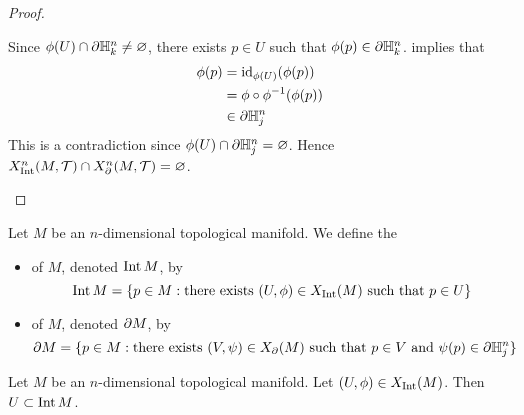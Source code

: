 \documentclass{book}
\begin{document}
\begin{proof}
\begin{enumerate}
			Since $\phi(U) \cap \partial \mathbb{H}^n_k \neq \varnothing$, there exists $p \in U$ such that $\phi(p) \in \partial \mathbb{H}^n_k$.  implies that 
			\begin{align*}
				\phi(p)
				& = \operatorname{id}_{\phi(U)}(\phi(p)) \\
				& = \phi \circ \phi^{-1}(\phi(p)) \\
				& \in \partial \mathbb{H}^n_j
			\end{align*}
			This is a contradiction since $\phi(U) \cap \partial \mathbb{H}^n_j = \varnothing$. Hence $X^n_{\operatorname{Int}}(M, \mathcal{T}) \cap X^n_{\partial}(M, \mathcal{T}) = \varnothing$.
		\end{enumerate}
	\end{proof}


	\begin{defn} 
		Let $M$ be an $n$-dimensional topological manifold. We define the
		\begin{itemize}
			\item {} of $M$, denoted $\operatorname{Int} M$, by 
			$$\operatorname{Int} M = \{p \in M: \text{there exists $(U, \phi) \in X_{\operatorname{Int}}(M)$ such that $p \in U$}\}$$
			\item {} of $M$, denoted $\partial M$, by 
			$$\partial M = \{p \in M: \text{there exists $(V, \psi) \in X_{\partial}(M)$ such that $p \in V$ and $\psi(p) \in \partial \mathbb{H}^n_j $}\}$$
		\end{itemize}
	\end{defn}


	\begin{ex} 
		Let $M$ be an $n$-dimensional topological manifold. Let $(U, \phi) \in X_{\operatorname{Int}}(M)$. Then $U \subset \operatorname{Int} M$.
	\end{ex}
	
\end{document}
